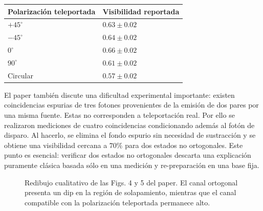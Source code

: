 \documentclass[12pt,a4paper]{article}
\theoremstyle{definition}
\theoremstyle{plain}
\theoremstyle{remark}
\begin{document}
\begin{center}
\renewcommand{\arraystretch}{1.25}
\begin{tabular}{>{\centering\arraybackslash}p{} >{\centering\arraybackslash}p{}}
\toprule
\textbf{Polarización teleportada} & \textbf{Visibilidad reportada} \\
\midrule
$+45^\circ$ & $0.63\pm0.02$ \\
$-45^\circ$ & $0.64\pm0.02$ \\
$0^\circ$ & $0.66\pm0.02$ \\
$90^\circ$ & $0.61\pm0.02$ \\
Circular & $0.57\pm0.02$ \\
\bottomrule
\end{tabular}
\end{center}

El paper también discute una dificultad experimental importante: existen coincidencias espurias de tres fotones provenientes de la emisión de dos pares por una misma fuente. Estas no corresponden a teleportación real. Por ello se realizaron mediciones de cuatro coincidencias condicionando además al fotón de disparo. Al hacerlo, se elimina el fondo espurio sin necesidad de sustracción y se obtiene una visibilidad cercana a $70\%$ para dos estados no ortogonales. Este punto es esencial: verificar dos estados no ortogonales descarta una explicación puramente clásica basada sólo en una medición y re-preparación en una base fija.

\begin{figure}[htbp]
    \centering
    \shorthandoff{<>}
    \caption{Redibujo cualitativo de las Figs. 4 y 5 del paper. El canal ortogonal presenta un dip en la región de solapamiento, mientras que el canal compatible con la polarización teleportada permanece alto.}
    \label{fig:resultados-dips}
\end{figure}
\end{document}
